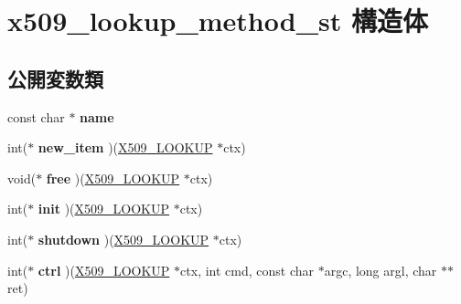 \hypertarget{structx509__lookup__method__st}{}\section{x509\+\_\+lookup\+\_\+method\+\_\+st 構造体}
\label{structx509__lookup__method__st}
\subsection*{公開変数類}
\begin{DoxyCompactItemize}
\item 
\hypertarget{structx509__lookup__method__st_a57a76d2d34d7749b3874c7809337390c}{}const char $\ast$ {\bfseries name}\label{structx509__lookup__method__st_a57a76d2d34d7749b3874c7809337390c}

\item 
\hypertarget{structx509__lookup__method__st_a308b007d8cb1b10bc525d9a8a794926e}{}int($\ast$ {\bfseries new\+\_\+item} )(\hyperlink{structx509__lookup__st}{X509\+\_\+\+L\+O\+O\+K\+U\+P} $\ast$ctx)\label{structx509__lookup__method__st_a308b007d8cb1b10bc525d9a8a794926e}

\item 
\hypertarget{structx509__lookup__method__st_a0ef0e21d7fe023bc976d002e1dd5a810}{}void($\ast$ {\bfseries free} )(\hyperlink{structx509__lookup__st}{X509\+\_\+\+L\+O\+O\+K\+U\+P} $\ast$ctx)\label{structx509__lookup__method__st_a0ef0e21d7fe023bc976d002e1dd5a810}

\item 
\hypertarget{structx509__lookup__method__st_a04ca0ebad723cae3fa9cb487c56e09a0}{}int($\ast$ {\bfseries init} )(\hyperlink{structx509__lookup__st}{X509\+\_\+\+L\+O\+O\+K\+U\+P} $\ast$ctx)\label{structx509__lookup__method__st_a04ca0ebad723cae3fa9cb487c56e09a0}

\item 
\hypertarget{structx509__lookup__method__st_aa201108d16466a85c87dd0b86288087a}{}int($\ast$ {\bfseries shutdown} )(\hyperlink{structx509__lookup__st}{X509\+\_\+\+L\+O\+O\+K\+U\+P} $\ast$ctx)\label{structx509__lookup__method__st_aa201108d16466a85c87dd0b86288087a}

\item 
\hypertarget{structx509__lookup__method__st_a87357ddd14742495a20e4e7be7cdfab2}{}int($\ast$ {\bfseries ctrl} )(\hyperlink{structx509__lookup__st}{X509\+\_\+\+L\+O\+O\+K\+U\+P} $\ast$ctx, int cmd, const char $\ast$argc, long argl, char $\ast$$\ast$ret)\label{structx509__lookup__method__st_a87357ddd14742495a20e4e7be7cdfab2}


\end{DoxyCompactItemize}
